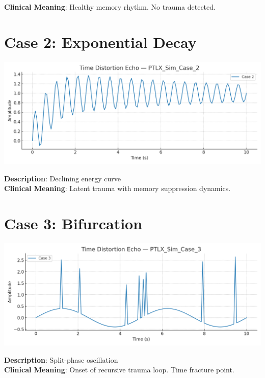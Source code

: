\documentclass[12pt]{article}
\begin{document}
\textbf{Clinical Meaning}: Healthy memory rhythm. No trauma detected.

\newpage

\section*{Case 2: Exponential Decay}
\begin{center}
\includegraphics[width=0.95\linewidth]{PTLX_Sim_Case_2.png}
\end{center}
\textbf{Description}: Declining energy curve \\

\textbf{Clinical Meaning}: Latent trauma with memory suppression dynamics.

\newpage

\section*{Case 3: Bifurcation}
\begin{center}
\includegraphics[width=0.95\linewidth]{PTLX_Sim_Case_3.png}
\end{center}
\textbf{Description}: Split-phase oscillation \\

\textbf{Clinical Meaning}: Onset of recursive trauma loop. Time fracture point.

\newpage
\end{document}

